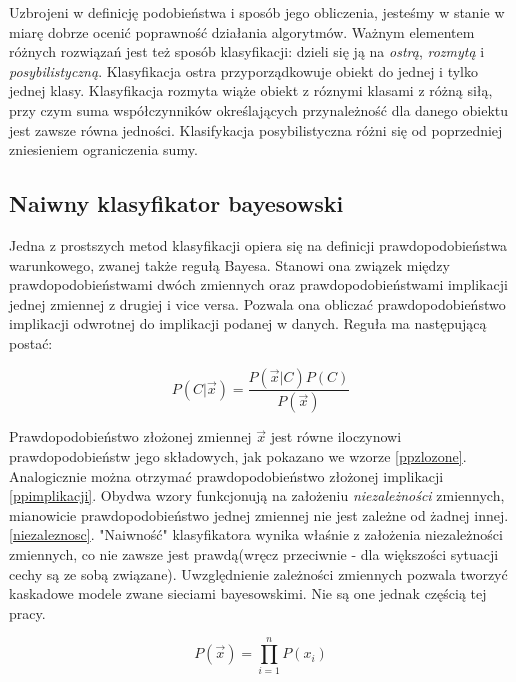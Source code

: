 \documentclass[12pt,a4paper,oneside]{report} %
\begin{document}
Uzbrojeni w definicję podobieństwa i sposób jego obliczenia, jesteśmy w stanie w miarę dobrze ocenić poprawność działania algorytmów. Ważnym elementem różnych rozwiązań jest też sposób klasyfikacji: dzieli się ją na \emph{ostrą}, \emph{rozmytą} i \emph{posybilistyczną}. Klasyfikacja ostra przyporządkowuje obiekt do jednej i tylko jednej klasy. Klasyfikacja rozmyta wiąże obiekt z róznymi klasami z różną siłą, przy czym suma współczynników określających przynależność dla danego obiektu jest zawsze równa jedności. Klasifykacja posybilistyczna różni się od poprzedniej zniesieniem ograniczenia sumy.\par


\subsection{Naiwny klasyfikator bayesowski}

Jedna z prostszych metod klasyfikacji opiera się na definicji prawdopodobieństwa warunkowego, zwanej także regułą Bayesa. Stanowi ona związek między prawdopodobieństwami dwóch zmiennych oraz prawdopodobieństwami implikacji jednej zmiennej z drugiej i vice versa. Pozwala ona obliczać prawdopodobieństwo implikacji odwrotnej do implikacji podanej w danych. Reguła ma następującą postać:\par

\begin{equation}
P(C|\vec{x}) = \frac{P(\vec{x}|C)P(C)}{P(\vec{x})}
\end{equation}

Prawdopodobieństwo złożonej zmiennej $\vec{x}$ jest równe iloczynowi prawdopodobieństw jego składowych, jak pokazano we wzorze \ref{ppzlozone}. Analogicznie można otrzymać prawdopodobieństwo złożonej implikacji \ref{ppimplikacji}. Obydwa wzory funkcjonują na założeniu \emph{niezależności} zmiennych, mianowicie prawdopodobieństwo jednej zmiennej nie jest zależne od żadnej innej. \ref{niezaleznosc}. "Naiwność" klasyfikatora wynika właśnie z założenia niezależności zmiennych, co nie zawsze jest prawdą(wręcz przeciwnie - dla większości sytuacji cechy są ze sobą związane). Uwzględnienie zależności zmiennych pozwala tworzyć kaskadowe modele zwane sieciami bayesowskimi. \cite{dm-cichosz} Nie są one jednak częścią tej pracy.\par

\begin{equation}
P(\vec{x}) = \prod\limits_{i=1}^n{P(x_i)}
\end{equation}
\label{ppzlozone}
\end{document}
